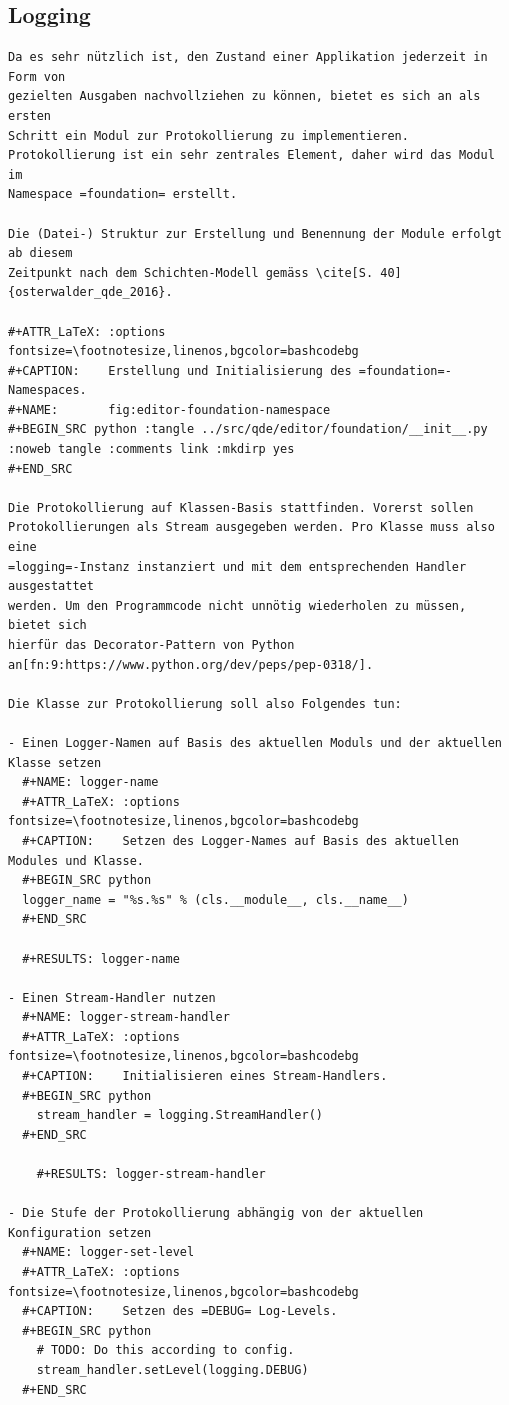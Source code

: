 \documentclass[10pt, openright, notitlepage]{scrreprt}
\begin{document}
\subsection{Logging}
\label{sec:orga8a90b1}
\begin{verbatim}
Da es sehr nützlich ist, den Zustand einer Applikation jederzeit in Form von
gezielten Ausgaben nachvollziehen zu können, bietet es sich an als ersten
Schritt ein Modul zur Protokollierung zu implementieren.
Protokollierung ist ein sehr zentrales Element, daher wird das Modul im
Namespace =foundation= erstellt.

Die (Datei-) Struktur zur Erstellung und Benennung der Module erfolgt ab diesem
Zeitpunkt nach dem Schichten-Modell gemäss \cite[S. 40]{osterwalder_qde_2016}.

#+ATTR_LaTeX: :options fontsize=\footnotesize,linenos,bgcolor=bashcodebg
#+CAPTION:    Erstellung und Initialisierung des =foundation=-Namespaces.
#+NAME:       fig:editor-foundation-namespace
#+BEGIN_SRC python :tangle ../src/qde/editor/foundation/__init__.py :noweb tangle :comments link :mkdirp yes
#+END_SRC

Die Protokollierung auf Klassen-Basis stattfinden. Vorerst sollen
Protokollierungen als Stream ausgegeben werden. Pro Klasse muss also eine
=logging=-Instanz instanziert und mit dem entsprechenden Handler ausgestattet
werden. Um den Programmcode nicht unnötig wiederholen zu müssen, bietet sich
hierfür das Decorator-Pattern von Python
an[fn:9:https://www.python.org/dev/peps/pep-0318/].

Die Klasse zur Protokollierung soll also Folgendes tun:

- Einen Logger-Namen auf Basis des aktuellen Moduls und der aktuellen Klasse setzen
  #+NAME: logger-name
  #+ATTR_LaTeX: :options fontsize=\footnotesize,linenos,bgcolor=bashcodebg
  #+CAPTION:    Setzen des Logger-Names auf Basis des aktuellen Modules und Klasse.
  #+BEGIN_SRC python
  logger_name = "%s.%s" % (cls.__module__, cls.__name__)
  #+END_SRC

  #+RESULTS: logger-name

- Einen Stream-Handler nutzen
  #+NAME: logger-stream-handler
  #+ATTR_LaTeX: :options fontsize=\footnotesize,linenos,bgcolor=bashcodebg
  #+CAPTION:    Initialisieren eines Stream-Handlers.
  #+BEGIN_SRC python
    stream_handler = logging.StreamHandler()
  #+END_SRC

    #+RESULTS: logger-stream-handler

- Die Stufe der Protokollierung abhängig von der aktuellen Konfiguration setzen
  #+NAME: logger-set-level
  #+ATTR_LaTeX: :options fontsize=\footnotesize,linenos,bgcolor=bashcodebg
  #+CAPTION:    Setzen des =DEBUG= Log-Levels.
  #+BEGIN_SRC python
    # TODO: Do this according to config.
    stream_handler.setLevel(logging.DEBUG)
  #+END_SRC


\end{verbatim}
\end{document}
